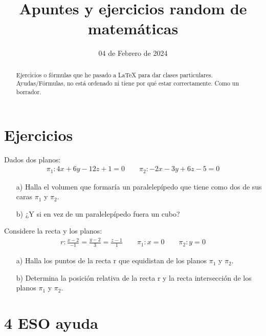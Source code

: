 \documentclass{article}
\title{Apuntes y ejercicios random de matemáticas}
\author{}
\date{04 de Febrero de 2024}
\begin{document}
\maketitle


\begin{abstract}

Ejercicios o fórmulas que he pasado a LaTeX para dar clases particulares. Ayudas/Fórmulas, no está ordenado ni tiene por qué estar correctamente. Como un borrador.

\end{abstract}


\section{Ejercicios}


 Dados dos planos:
\begin{gather*}
    \pi_1 :  4x + 6y - 12z + 1 = 0 \quad  \quad \pi_2 : -2x - 3y + 6z - 5 = 0
\end{gather*}

\begin{enumerate}
    \setcounter{enumi}{0} %
    \item[a)] Halla el volumen que formaría un paralelepípedo que tiene como dos de sus caras $\pi_1$ y $\pi_2$.
    \item[b)] ¿Y si en vez de un paralelepípedo fuera un cubo?
\end{enumerate}

\quad
\quad
\quad

 Considere la recta y los planos:
\begin{gather*}
    r :  \frac{x-2}{-1} = \frac{y-2}{3} = \frac{z-1}{1}\quad  \quad \pi_1 : x = 0 \quad  \quad \pi_2 : y = 0
\end{gather*}
\begin{enumerate}
    \setcounter{enumi}{0} %
    \item[a)] Halla los puntos de la recta r que equidistan de los planos $\pi_1$ y $\pi_2$.
    \item[b)] Determina la posición relativa de la recta r y la recta intersección de los planos $\pi_1$ y $\pi_2$.
\end{enumerate}


\section{4 ESO ayuda}
\end{document}
